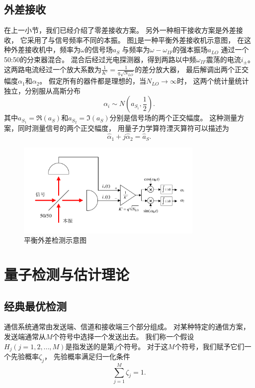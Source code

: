 \subsection{外差接收}
在上一小节，我们已经介绍了零差接收方案。
另外一种相干接收方案是外差接收\cite{gagliardi1976optical,gagliardi1998optical}，
它采用了与信号频率不同的本振。
图\ref{fig:HeD}是一种平衡外差接收机示意图，
在这种外差接收机中，频率为$\omega$的信号场$a_S$
与频率为$\omega - \omega_{IF}$的强本振场$a_{LO}$
通过一个50:50的分束器混合。
混合后经过光电探测器，得到两路以中频$\omega_{IF}$震荡的电流$i_\pm$。
这两路电流经过一个放大系数为$\frac{1}{K'}=\frac{1}{q\sqrt{N_{LO}}}$的差分放大器，
最后解调出两个正交幅度$\alpha_1$和$\alpha_2$。
假定所有的器件都是理想的，当$N_{LO} \rightarrow \infty$时，
这两个统计量统计独立，分别服从高斯分布
\begin{equation}
\alpha_i \sim N(a_{S_i}, \frac{1}{2}).
\label{eq:Her-receiver-output}
\end{equation}
其中$a_{S_1}=\Re(a_S)$和$a_{S_2}=\Im(a_S)$分别是信号场的两个正交幅度。
这种测量方案，同时测量信号的两个正交幅度，
用量子力学算符湮灭算符可以描述为\cite{yuen1980optical,mandel1995optical}
\begin{equation}
\hat{\alpha}_1 + j \hat{\alpha}_2 = \hat{a}_S.
\label{eq:Her-receiver-output-2}
\end{equation}



\begin{figure}
\centering
  \includegraphics[width=0.8\textwidth]{figures/chap2/heretrodyne-receiver.pdf}
  \caption{平衡外差检测示意图}
  \label{fig:HeD}
\end{figure}


\section{量子检测与估计理论}
\subsection{经典最优检测}
通信系统通常由发送端、信道和接收端三个部分组成。
对某种特定的通信方案，发送端通常从$M$个符号中选择一个发送出去。
我们称一个假设$H_j (j=1,2,...,M)$是指发送的是第$j$个符号。
对于这$M$个符号，我们赋予它们一个先验概率$\zeta_j$，
先验概率满足归一化条件
\begin{equation}
\sum_{j=1}^M \zeta_j = 1.
\end{equation}


